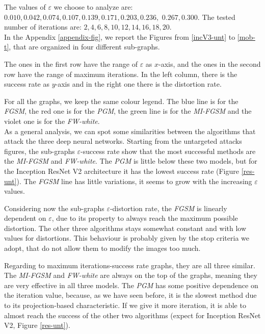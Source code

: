 \documentclass[10pt,twocolumn,letterpaper, english]{article}
\theoremstyle{definition}
\theoremstyle{plain}
\theoremstyle{plain}
\theoremstyle{plain}
\theoremstyle{plain}
\theoremstyle{remark}
\theoremstyle{remark}
\theoremstyle{definition}
\theoremstyle{definition}
\theoremstyle{definition}
\theoremstyle{definition}
\renewcommand{\epsilon}{\varepsilon}
\begin{document}
The values of $\epsilon$ we choose to analyze are: $0.010, 0.042, 0.074, 0.107, 0.139, 0.171, 0.203, 0.236,$  $0.267, 0.300$. The tested number of iterations are: $2,4,6,8,10,12,14,16,18,20$. \\

In the Appendix \ref{appendix-fig}, we report the Figures from \ref{incV3-unt} to \ref{mob-t}, that are organized in four different sub-graphs. 

The ones in the first row have the range of $\epsilon$ as $x$-axis, and the ones in the second row have the range of maximum iterations. 
In the left column, there is the success rate as $y$-axis and in the right one there is the distortion rate. 

For all the graphs, we keep the same colour legend. 
The blue line is for the \textit{FGSM}, the red one is for the \textit{PGM}, the green line is for the \textit{MI-FGSM} and the violet one is for the \textit{FW-white}. \\

As a general analysis, we can spot some similarities between the algorithms that attack the three deep neural networks. 
Starting from the untargeted attacks figures, the sub-graphs $\epsilon$-success rate show that the most successful methods are the \textit{MI-FGSM} and \textit{FW-white}.
The \textit{PGM} is little below these two models, but for the Inception ResNet V2 architecture it has the lowest success rate (Figure \ref{res-unt}).
The \textit{FGSM} line has little variations, it seems to grow with the increasing $\epsilon$ values. 

Considering now the sub-graphs $\epsilon$-distortion rate, the \textit{FGSM} is linearly dependent on $\epsilon$, due to its property to always reach the maximum possible distortion.
The other three algorithms stays somewhat constant and with low values for distortions. 
This behaviour is probably given by the stop criteria we adopt, that do not allow them to modify the images too much. 

Regarding to maximum iterations-success rate graphs, they are all three similar. 
The \textit{MI-FGSM} and \textit{FW-white} are always on the top of the graphs, meaning they are very effective in all three models. 
The \textit{PGM} has some positive dependence on the iteration value, because, as we have seen before, it is the slowest method due to its projection-based characteristic. 
If we give it more iteration, it is able to almost reach the success of the other two algorithms (expect for Inception ResNet V2, Figure \ref{res-unt}). 
\end{document}
